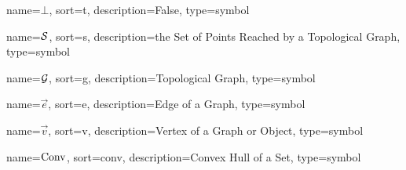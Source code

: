 	{%
		name=\ensuremath{\bot},
		sort=t,
		description=False,
		type=symbol
	}
	\newcommand{\false}{\gls{sym:false}}

	{%
		name=\ensuremath{\set{S}},
		sort=s,
		description=the Set of Points Reached by a Topological Graph,
		type=symbol
	}
	\newcommand{\swath}{\gls{sym:swath}}

	{%
		name=\ensuremath{\set{G}},
		sort=g,
		description=Topological Graph,
		type=symbol
	}
	\newcommand{\topologicalgraph}{\gls{sym:topologicalgraph}}

	{%
		name=\ensuremath{\vec{e}},
		sort=e,
		description=Edge of a Graph,
		type=symbol
	}
	\newcommand{\edge}{\gls{sym:edge}}

	{%
		name=\ensuremath{\vec{v}},
		sort=v,
		description=Vertex of a Graph or Object,
		type=symbol
	}
	\newcommand{\vertex}{\gls{sym:vertex}}

	{%
		name=\ensuremath{\func{Conv}},
		sort=conv,
		description=Convex Hull of a Set,
		type=symbol
	}
	\newcommand{\convexhull}{\gls{sym:convexhull}}


